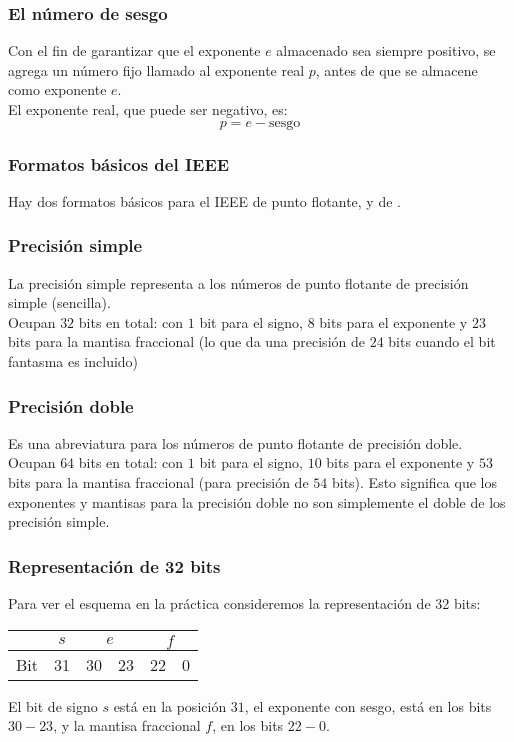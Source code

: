 \documentclass[12pt]{beamer}
\begin{document}
\begin{frame}
\frametitle{El número de sesgo}
Con el fin de garantizar que el exponente $e$ almacenado sea siempre positivo, se agrega un número fijo llamado  al exponente real $p$, antes de que se almacene como exponente $e$.
\\
\bigskip
\pause
El exponente real, que puede ser negativo, es:
\pause
\begin{equation}
p = e - \text{sesgo}
\label{eq:ecuacion_01_03}
\end{equation}
\end{frame}
\begin{frame}
\frametitle{Formatos básicos del IEEE}
Hay dos formatos básicos para el IEEE de punto flotante,  y de .
\end{frame}
\begin{frame}
\frametitle{Precisión simple}
La precisión simple representa a los números de punto flotante de precisión simple (sencilla).
\\
\bigskip
\pause
Ocupan $32$ bits en total: con $1$ bit para el signo, $8$ bits para el exponente y $23$ bits para la mantisa fraccional (lo que da una precisión de $24$ bits cuando el bit fantasma es incluido)
\end{frame}
\begin{frame}
\frametitle{Precisión doble}
Es una abreviatura para los números de punto flotante de precisión doble.
\\
\bigskip
\pause
Ocupan $64$ bits en total: con $1$ bit para el signo, $10$ bits para el exponente y $53$ bits para la mantisa fraccional (para precisión de $54$ bits). \pause Esto significa que los exponentes y mantisas para la precisión doble no son simplemente el doble de los precisión simple.
\end{frame}
\begin{frame}
\frametitle{Representación de 32 bits}
Para ver el esquema en la práctica consideremos la representación de 32 bits:
\pause
\begin{table}
\fontsize{12}{12}\selectfont
\begin{tabular}{l | c | c | c | c | c|}
\cline{2-6}
 {} & $s$ & \multicolumn{2}{c|}{$e$} & \multicolumn{2}{c|}{$f$} \\ \hline
 Bit & 31 & 30 & 23 & 22 & 0 \\ \hline
\end{tabular}
\end{table}
\pause
El bit de signo $s$ está en la posición $31$, el exponente con sesgo, está en los bits $30-23$, y la mantisa fraccional $f$, en los bits $22 - 0$.
\end{frame}
\end{document}
